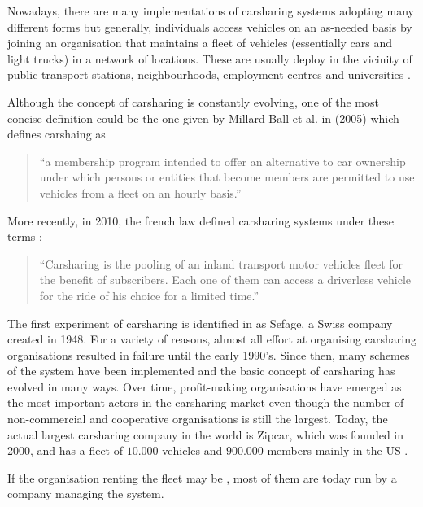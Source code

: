 \begin{bibunit}[ieeetr]
Nowadays, there are many implementations of carsharing systems adopting many different forms but generally, individuals access vehicles on an as-needed basis by joining an organisation that maintains a fleet of vehicles (essentially cars and light trucks) in a network of locations.
These are usually deploy in the vicinity of public transport stations, neighbourhoods, employment centres and universities \cite{shaheen_carsharing_1998}.

Although the concept of carsharing is constantly evolving, one of the most concise definition could be the one given by Millard-Ball et al. in (2005) \cite{millard_ball_car_sharing_2005} which defines carshaing as
\begin{quote} %
``a membership program intended to offer an alternative to car ownership under which persons or entities that become members are permitted to use vehicles from a fleet on an hourly basis.''
\end{quote}
More recently, in 2010, the french law defined carsharing systems under these terms \cite{cs_loi_2010}:
\begin{quote}
``Carsharing is the pooling of an inland transport motor vehicles fleet for the benefit of subscribers. Each one of them can access a driverless vehicle for the ride of his choice for a limited time.''
\end{quote}

The first experiment of carsharing is identified in \cite{shaheen_short_1999} as Sefage, a Swiss company created in 1948.
For a variety of reasons, almost all effort at organising carsharing organisations resulted in failure until the early 1990's.
Since then, many schemes of the system have been implemented and the basic concept of carsharing has evolved in many ways.
Over time, profit-making organisations have emerged as the most important actors in the carsharing market even though the number of non-commercial and cooperative organisations is still the largest.
Today, the actual largest carsharing company in the world is Zipcar, which was founded in 2000, and has a fleet of $10.000$ vehicles and $900.000$ members mainly in the US \cite{zipcar_website}.





If the organisation renting the fleet may be , most of them are today run by a company managing the system. %


\end{bibunit}
